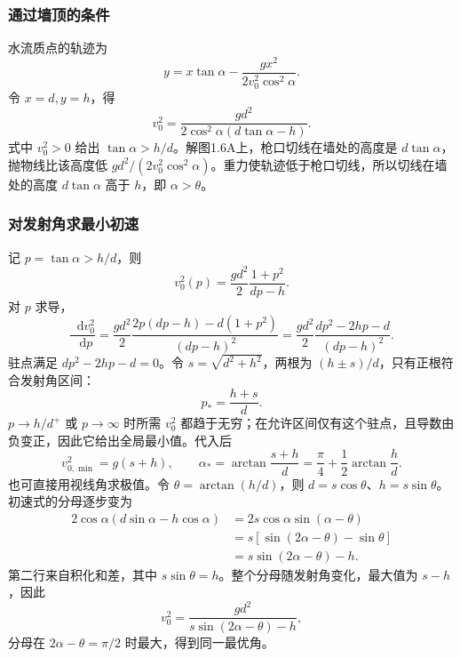 \documentclass[UTF8,fontset=fandol,a4paper,11pt]{ctexart}
\newcommand{\dd}{\mathop{}\!\mathrm{d}}
\begin{document}
\subsubsection*{通过墙顶的条件}
水流质点的轨迹为
\[
y=x\tan\alpha-\frac{gx^2}{2v_0^2\cos^2\alpha}.
\]
令 $x=d,y=h$，得
\[
v_0^2=\frac{gd^2}{2\cos^2\alpha(d\tan\alpha-h)}.
\]
式中 $v_0^2>0$ 给出 $\tan\alpha>h/d$。解图1.6A上，枪口切线在墙处的高度是 $d\tan\alpha$，抛物线比该高度低 $gd^2/(2v_0^2\cos^2\alpha)$。重力使轨迹低于枪口切线，所以切线在墙处的高度 $d\tan\alpha$ 高于 $h$，即 $\alpha>\theta$。
\subsubsection*{对发射角求最小初速}
记 $p=\tan\alpha>h/d$，则
\[
v_0^2(p)=\frac{gd^2}{2}\frac{1+p^2}{dp-h}.
\]
对 $p$ 求导，
\[
\frac{\dd v_0^2}{\dd p}
=\frac{gd^2}{2}\frac{2p(dp-h)-d(1+p^2)}{(dp-h)^2}
=\frac{gd^2}{2}\frac{dp^2-2hp-d}{(dp-h)^2}.
\]
驻点满足 $dp^2-2hp-d=0$。令 $s=\sqrt{d^2+h^2}$，两根为 $(h\pm s)/d$，只有正根符合发射角区间：
\[
p_* =\frac{h+s}{d}.
\]
$p\to h/d^+$ 或 $p\to\infty$ 时所需 $v_0^2$ 都趋于无穷；在允许区间仅有这个驻点，且导数由负变正，因此它给出全局最小值。代入后
\[
\boxed{v_{0,\min}^2=g(s+h)},\qquad
\boxed{\alpha_* =\arctan\frac{s+h}{d}
=\frac\pi4+\frac12\arctan\frac hd}.
\]
也可直接用视线角求极值。令 $\theta=\arctan(h/d)$，则 $d=s\cos\theta$、$h=s\sin\theta$。初速式的分母逐步变为
\[
\begin{aligned}
2\cos\alpha(d\sin\alpha-h\cos\alpha)
&=2s\cos\alpha\sin(\alpha-\theta)\\
&=s[\sin(2\alpha-\theta)-\sin\theta]\\
&=s\sin(2\alpha-\theta)-h.
\end{aligned}
\]
第二行来自积化和差，其中 $s\sin\theta=h$。整个分母随发射角变化，最大值为 $s-h$，因此
\[
v_0^2=\frac{gd^2}{s\sin(2\alpha-\theta)-h},
\]
分母在 $2\alpha-\theta=\pi/2$ 时最大，得到同一最优角。
\Needspace{0.46\textheight}
\end{document}
